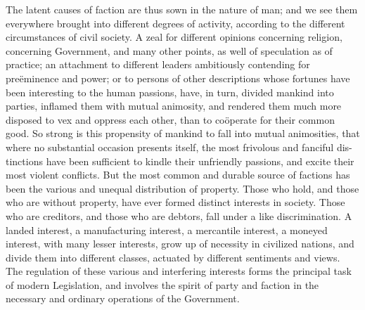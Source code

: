 The latent causes of faction are thus sown in the nature of man; and
we see them everywhere brought into different degrees of activity,
according to the different circumstances of civil society. A zeal for
different opinions concerning religion, concerning Government, and
many other points, as well of speculation as of practice; an
attachment to different leaders ambitiously contending for
pre\"{e}minence and power; or to persons of other descriptions whose
fortunes have been interesting to the human passions, have, in turn,
divided mankind into parties, inflamed them with mutual animosity, and
rendered them much more disposed to vex and oppress each other, than
to co\"{o}perate for their common good. So strong is this propensity
of mankind to fall into mutual animosities, that where no substantial
occasion presents itself, the most frivolous and fanciful
dis-tinctions have been sufficient to kindle their unfriendly
passions, and excite their most violent conflicts. But the most common
and durable source of factions has been the various and unequal
distribution of property. Those who hold, and those who are without
property, have ever formed distinct interests in society. Those who
are creditors, and those who are debtors, fall under a like
discrimination. A landed interest, a manufacturing interest, a
mercantile interest, a moneyed interest, with many lesser interests,
grow up of necessity in civilized nations, and divide them into
different classes, actuated by different sentiments and views. The
regulation of these various and interfering interests forms the
principal task of modern Legislation, and involves the spirit of party
and faction in the necessary and ordinary operations of the Government.

